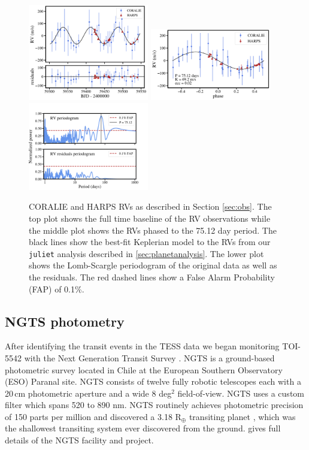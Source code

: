 \documentclass{aa}
\newcommand{\juliet}{{\sc \tt juliet}\xspace}
\begin{document}
\begin{figure}
  \centering
  \includegraphics[width=0.47\textwidth]{figures/RVfull_TOI-5542.pdf}
  \includegraphics[width=0.47\textwidth]{figures/RVphase_TOI-5542.pdf}
  \includegraphics[width=0.47\textwidth]{figures/RVperiodograms_TOI-5542.pdf}
  \caption{CORALIE and HARPS RVs as described in Section \ref{sec:obs}. The top plot shows the full time baseline of the RV observations while the middle plot shows the RVs phased to the 75.12 day period. The black lines show the best-fit Keplerian model to the RVs from our \juliet analysis described in \ref{sec:planetanalysis}. The lower plot shows the Lomb-Scargle periodogram of the original data as well as the residuals. The red dashed lines show a False Alarm Probability (FAP) of 0.1\%.}
  \label{fig:rvs}
\end{figure}

\subsection{NGTS photometry}

After identifying the transit events in the TESS data we began monitoring TOI-5542 with the  Next  Generation  Transit  Survey  \citep[NGTS;][]{Wheatley2018}. NGTS is a ground-based photometric survey located in Chile at the European Southern Observatory (ESO) Paranal site. NGTS consists of twelve fully robotic telescopes each with a 20\,cm photometric aperture and a wide 8 deg$^{2}$ field-of-view. NGTS uses a custom filter which spans 520 to 890 nm. NGTS routinely achieves photometric precision of 150 parts per million and discovered a 3.18 R$_{\oplus}$ transiting planet \citep[NGTS-4b;][]{West2019}, which was the shallowest transiting system ever discovered from the ground. \citet{Wheatley2018} gives full details of the NGTS facility and project.
\end{document}
